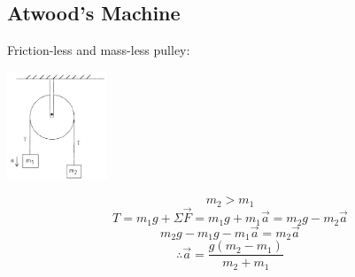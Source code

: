 \documentclass{article}
\begin{document}
\subsection{Atwood's Machine}
Friction-less and mass-less pulley:

\begin{multicols}{2}
  \centerline{\includegraphics[width=3cm]{atwood.png}}
  \columnbreak
  \[
  m_2>m_1
  \]
  \[
  T=m_1g+\Sigma\vec{F}=m_1g+m_1\vec{a}=m_2g-m_2\vec{a}
  \]
  \[
  m_2g-m_1g-m_1\vec{a}=m_2\vec{a}
  \]
  \[
  \therefore\vec{a}=\frac{g(m_2-m_1)}{m_2+m_1}
  \]
\end{multicols}
\end{document}
